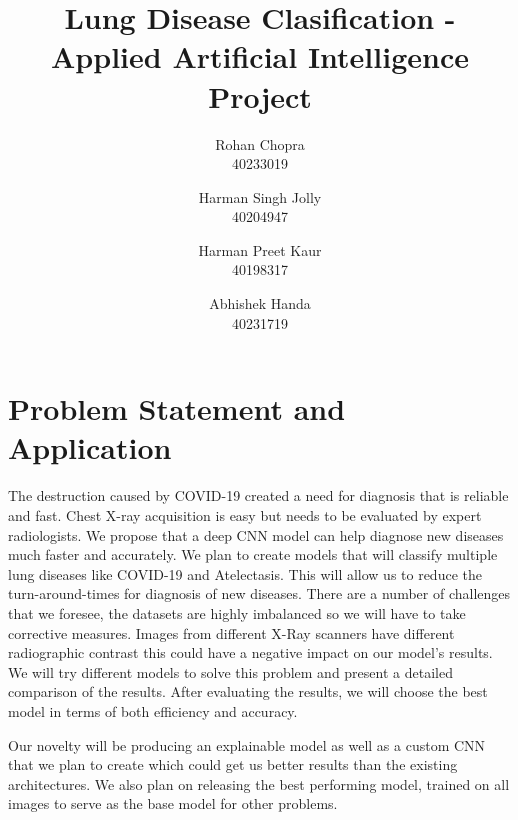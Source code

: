 \documentclass[10pt,twocolumn,letterpaper]{article}
\def\subName{Applied Artificial Intelligence }
\begin{document}

\def\cvprPaperID{Group-Q} %
\def\confName{COMP6721}
\def\confYear{2022}

\title{Lung Disease Clasification - \subName Project}

\author{Rohan Chopra\\
\small 40233019\\
\and
Harman Singh Jolly\\
\small 40204947\\
\and
Harman Preet Kaur\\
\small 40198317\\
\and
Abhishek Handa\\
\small 40231719\\
}
\maketitle
\section{Problem Statement and Application}
\label{sec:intro}
The destruction caused by COVID-19 created a need for diagnosis 
that is reliable and fast\cite{vandenberg2021considerations}. Chest 
X-ray acquisition is easy but needs to be evaluated by expert 
radiologists\cite{xrayread}. We propose that a deep CNN model can help 
diagnose new diseases much 
faster and accurately. We plan to create models that will 
classify multiple lung diseases like COVID-19 and 
Atelectasis. This will allow us to reduce the turn-around-times 
for diagnosis of new diseases. 
There are a number of challenges that we foresee, the datasets 
are highly imbalanced so we will have to take corrective measures. Images 
from different X-Ray scanners have different radiographic contrast 
\cite{andrew2022rad} this could have a negative impact on our model's results. 
We will try different models to solve this problem and present a 
detailed comparison of the results. After evaluating the results, 
we will choose the best model in terms of both efficiency and 
accuracy. 

Our novelty will be producing an explainable model as well as 
a custom CNN that we plan to create which could get us better 
results than the existing architectures. We also plan on releasing
the best performing model, trained on all images to  
serve as the base model for other problems.
\end{document}
